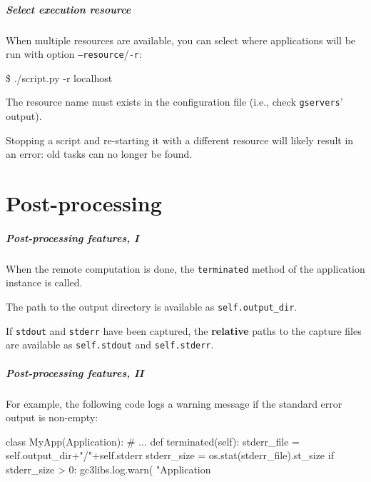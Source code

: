 \documentclass[english,serif,mathserif,xcolor=pdftex,dvipsnames,table]{beamer}
\begin{document}
\begin{frame}
  \frametitle{Select execution resource}

  When multiple resources are available, you can select where
  applications will be run with option \texttt{--resource}/\texttt{-r}:
\begin{semiverbatim}
    \$ ./script.py -r localhost
\end{semiverbatim}

  \+ The resource name must exists in the configuration file (i.e.,
  check \texttt{gservers}' output).

  \+ Stopping a script and re-starting it with a different resource
  will likely result in an error: old tasks can no longer be found.
\end{frame}


\part{Post-processing}

\begin{frame}[fragile]
  \frametitle{Post-processing features, I}

  When the remote computation is done, the \texttt{terminated} method
  of the application instance is called.

  \+
  The path to the output directory is available as
  \lstinline|self.output_dir|.

  \+
  If \texttt{stdout} and \texttt{stderr}
  have been captured, the \textbf{relative} paths to the capture files
  are available as \lstinline|self.stdout| and
  \lstinline|self.stderr|.
\end{frame}


\begin{frame}[fragile]
  \frametitle{Post-processing features, II}

  For example, the following code logs a warning message if the
  standard error output is non-empty:
\begin{python}
class MyApp(Application):
  # ...
  def terminated(self):
    stderr_file = self.output_dir+"/"+self.stderr
    stderr_size = os.stat(stderr_file).st_size
    if stderr_size > 0:
      gc3libs.log.warn(
        "Application %
\end{python}
\end{frame}
\end{document}
